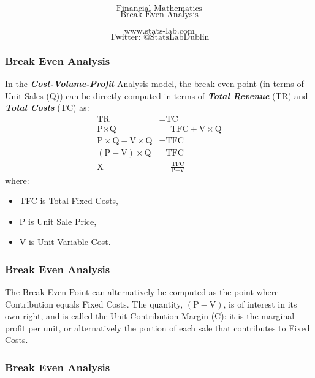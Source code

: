 \documentclass{beamer}
\begin{document}
\begin{frame}
\Huge
\[\mbox{Financial Mathematics}\]
\LARGE
\[\mbox{Break Even Analysis}\]

\Large
\[\mbox{www.stats-lab.com}\]
\[\mbox{Twitter: @StatsLabDublin}\]

\end{frame}


\begin{frame}
\frametitle{Break Even Analysis}
\Large
In the \textit{\textbf{Cost-Volume-Profit}} Analysis model, the break-even point (in terms of Unit Sales (Q)) can be directly computed in terms of \textit{\textbf{Total Revenue}} (TR) and \textit{\textbf{Total Costs}} (TC) as:
\begin{eqnarray}
\text{TR} &=  \text{TC}\\
\text{P}\times \text{Q} &= \text{TFC} + \text{V} \times \text{Q}\\
\text{P}\times \text{Q} - \text{V} \times \text{Q} &= \text{TFC}\\
\left(\text{P} - \text{V}\right)\times \text{Q} &= \text{TFC}\\
\text{X} &= \frac{\text{TFC}}{\text{P} - \text{V}}
\end{eqnarray}
where:
\begin{itemize}
\item TFC is Total Fixed Costs,
\item P is Unit Sale Price, 
\item V is Unit Variable Cost.
\end{itemize}

\end{frame}

\begin{frame}
\frametitle{Break Even Analysis}

The Break-Even Point can alternatively be computed as the point where Contribution equals Fixed Costs.
The quantity, $\left(\text{P} - \text{V}\right)$, is of interest in its own right, and is called the Unit Contribution Margin (C): it is the marginal profit per unit, or alternatively the portion of each sale that contributes to Fixed Costs. 
\end{frame}

\begin{frame}
\frametitle{Break Even Analysis}

\end{frame}
\end{document}

